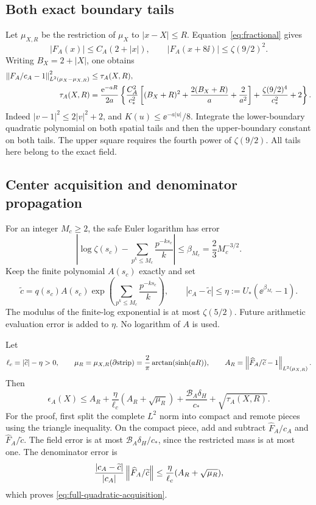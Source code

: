 \subsection{Both exact boundary tails}

Let \(\mu_{X,R}\) be the restriction of \(\mu_X\) to \(|x-X|\le R\).
Equation~\eqref{eq:fractional} gives
\[
 |F_A(x)|\le C_A(2+|x|),\qquad
 |F_A(x+8\ii)|\le\zeta(9/2)^2.
\]
Writing \(B_X=2+|X|\), one obtains
\begin{align}\label{eq:quadratic-tail}
 \left\lVert F_A/c_A-1\right\rVert_{L^2(\mu_X-\mu_{X,R})}^2
 &\le\tau_A(X,R),\nonumber\\
 \tau_A(X,R)
 &=\frac{\mathrm e^{-aR}}{2a}\left\{
 \frac{C_A^2}{c_*^2}
 \left[(B_X+R)^2+\frac{2(B_X+R)}a+\frac2{a^2}\right]
 +\frac{\zeta(9/2)^4}{c_*^2}+2\right\}.
\end{align}
Indeed \(|v-1|^2\le2|v|^2+2\), and
\(K(u)\le\ee^{-a|u|}/8\).
Integrate the lower-boundary quadratic polynomial on both spatial
tails and then the upper-boundary constant on both tails.
The upper square requires the fourth power of \(\zeta(9/2)\).
All tails here belong to the exact field.

\subsection{Center acquisition and denominator propagation}

For an integer \(M_c\ge2\), the safe Euler logarithm has error
\[
 \left|\log\zeta(s_c)-\sum_{p^k\le M_c}\frac{p^{-ks_c}}k\right|
 \le\beta_{M_c}=\frac23M_c^{-3/2}.
\]
Keep the finite polynomial \(A(s_c)\) exactly and set
\[
 \widetilde c=q(s_c)A(s_c)
       \exp\left(\sum_{p^k\le M_c}\frac{p^{-ks_c}}k\right),\qquad
 |c_A-\widetilde c|\le
 \eta:=U_*(\ee^{\beta_{M_c}}-1).
\]
The modulus of the finite-log exponential is at most \(\zeta(5/2)\).
Future arithmetic evaluation error is added to \(\eta\).
No logarithm of \(A\) is used.

Let
\[
 \ell_c=|\widetilde c|-\eta>0,\qquad
 \mu_R=\mu_{X,R}(\partial{\rm strip})
       =\frac2\pi\arctan(\sinh(aR)),\qquad
 A_R=\left\lVert\widehat F_A/\widetilde c-1\right\rVert_{L^2(\mu_{X,R})}.
\]
Then
\begin{equation}\label{eq:full-quadratic-acquisition}
 \epsilon_A(X)\le A_R+
 \frac{\eta}{\ell_c}(A_R+\sqrt{\mu_R})
 +\frac{\mathcal B_A\delta_H}{c_*}+\sqrt{\tau_A(X,R)}.
\end{equation}
For the proof, first split the complete \(L^2\) norm into compact
and remote pieces using the triangle inequality. On the compact
piece, add and subtract \(\widehat F_A/c_A\) and
\(\widehat F_A/\widetilde c\). The field error is at most
\(\mathcal B_A\delta_H/c_*\), since the restricted mass is at most one.
The denominator error is
\[
 \frac{|c_A-\widetilde c|}{|c_A|}
     \left\lVert\widehat F_A/\widetilde c\right\rVert
 \le\frac{\eta}{\ell_c}(A_R+\sqrt{\mu_R}),
\]
which proves \eqref{eq:full-quadratic-acquisition}.

